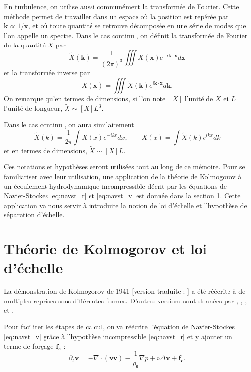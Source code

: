 En turbulence, on utilise aussi communément la transformée de Fourier. Cette méthode permet de travailler dans un espace où la position est repérée par $\boldsymbol{k} \propto 1/\mathbf{x}$, et où toute quantité se retrouve décomposée en une série de \og modes \fg{} que l'on appelle un spectre. Dans le cas continu , on définit la transformée de Fourier de la quantité $X$ par 
\begin{equation}
    \tilde{X}(\boldsymbol{k}) = \frac{1}{(2\pi)^3} \iiint X(\mathbf{x}) e^{-i\boldsymbol{k} \cdot \mathbf{x}} d\mathbf{x}
\end{equation}
et la transformée inverse par 
\begin{equation}
    X(\mathbf{x}) = \iiint \tilde{X}(\boldsymbol{k}) e^{i\boldsymbol{k} \cdot \mathbf{x}} d\boldsymbol{k}.
\end{equation} 
On remarque qu'en termes de dimensions, si l'on note $[X]$ l'unité de $X$ et $L$ l'unité de longueur, $\tilde{X} \sim [X] L^3$.

Dans le cas continu , on aura similairement : 
\begin{equation}
    \tilde{X}(k) = \frac{1}{2\pi} \int X(x) e^{-ikx} dx , \qquad 
    X(x) = \int \tilde{X}(k) e^{ikx} dk
\end{equation} 
et en termes de dimensions, $\tilde{X} \sim [X] L$.

Ces notations et hypothèses seront utilisées tout au long de ce mémoire. Pour se familiariser avec leur utilisation, une application de la théorie de Kolmogorov à un écoulement hydrodynamique incompressible décrit par les équations de Navier-Stockes \eqref{eq:navst_r} et \eqref{eq:navst_v} est donnée dans la section \ref{sec-013}. Cette application va nous servir à introduire la notion de loi d'échelle et l'hypothèse de séparation d'échelle.



 \section{Théorie de Kolmogorov et loi d'échelle}\label{sec-013}
 
 La démonstration de Kolmogorov de 1941 [version traduite :  \cite{kolmogorov_dissipation_1991,kolmogorov_local_1991}] a été réécrite à de multiples reprises sous différentes formes. D'autres versions sont données par \cite{monin_statistical_1975}, \cite{frisch_turbulence_1995}, \cite{antonia_analogy_1997}, et \cite{galtier_physique_2021}. 
 
Pour faciliter les étapes de calcul, on va réécrire l'équation de Navier-Stockes \eqref{eq:navst_v} grâce à l'hypothèse incompressible \eqref{eq:navst_r} et y ajouter un terme de forçage $\boldsymbol{f_c}$ : 
\begin{equation}
  \label{eq:navst_v2}  \partial_t \boldsymbol{v} = - \nabla \cdot (\boldsymbol{v} \boldsymbol{v}) -  \frac{1}{\rho_0} \nabla p + \nu \Delta \boldsymbol{v} + \boldsymbol{f_c} 
.\end{equation}

